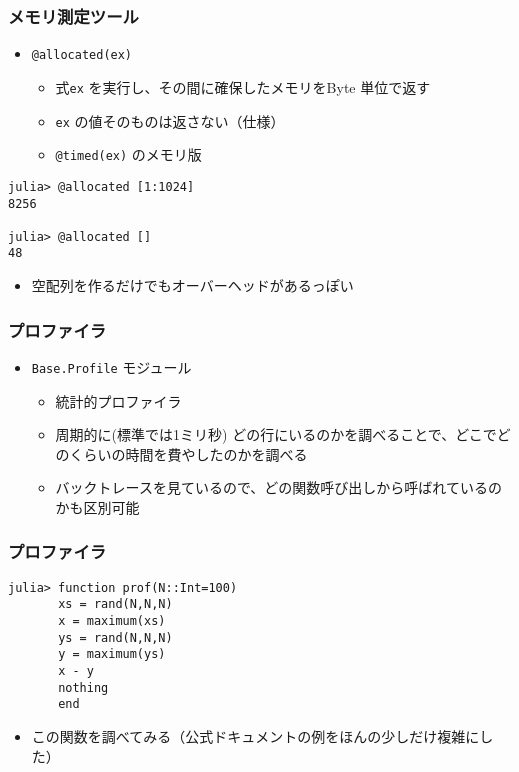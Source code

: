 \begin{frame}[containsverbatim]
\frametitle{メモリ測定ツール}
\begin{itemize}
  \item \verb|@allocated(ex)|
    \begin{itemize}
      \item 式\verb|ex| を実行し、その間に確保したメモリをByte 単位で返す
      \item \verb|ex| の値そのものは返さない（仕様）
      \item \verb|@timed(ex)| のメモリ版
    \end{itemize}
\end{itemize}
\begin{lstlisting}
julia> @allocated [1:1024]
8256

julia> @allocated []
48
\end{lstlisting}
\begin{itemize}
  \item 空配列を作るだけでもオーバーヘッドがあるっぽい
\end{itemize}
\end{frame}

\begin{frame}[containsverbatim]
\frametitle{プロファイラ}
\begin{itemize}
  \item \verb|Base.Profile| モジュール
    \begin{itemize}
      \item 統計的プロファイラ
      \item 周期的に(標準では1ミリ秒) どの行にいるのかを調べることで、どこでどのくらいの時間を費やしたのかを調べる
      \item バックトレースを見ているので、どの関数呼び出しから呼ばれているのかも区別可能
    \end{itemize}
\end{itemize}
\end{frame}

\begin{frame}[containsverbatim]
\frametitle{プロファイラ}
\begin{lstlisting}
julia> function prof(N::Int=100)
       xs = rand(N,N,N)
       x = maximum(xs)
       ys = rand(N,N,N)
       y = maximum(ys)
       x - y
       nothing
       end
\end{lstlisting}
\begin{itemize}
  \item この関数を調べてみる（公式ドキュメントの例をほんの少しだけ複雑にした）
\end{itemize}
\end{frame}

